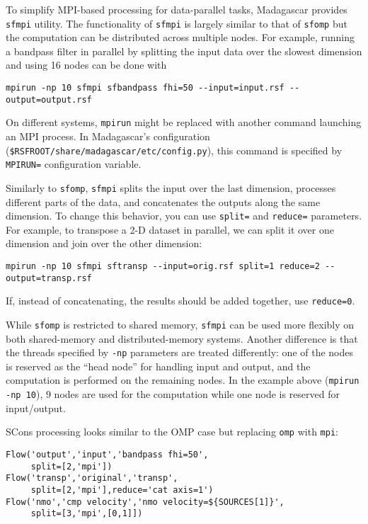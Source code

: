 To simplify MPI-based processing for data-parallel tasks, Madagascar
provides \texttt{sfmpi} utility. The functionality of \texttt{sfmpi}
is largely similar to that of \texttt{sfomp} but the computation can
be distributed across multiple nodes. For example, running a bandpass
filter in parallel by splitting the input data over the slowest
dimension and using 16 nodes can be done with
\begin{verbatim}
mpirun -np 10 sfmpi sfbandpass fhi=50 --input=input.rsf --output=output.rsf
\end{verbatim}
On different systems, \texttt{mpirun} might be replaced with another
command launching an MPI process. In Madagascar's configuration
(\texttt{\$RSFROOT/share/madagascar/etc/config.py}), this command is
specified by \texttt{MPIRUN=} configuration variable.

Similarly to \texttt{sfomp}, \texttt{sfmpi} splits the input over the last dimension,
processes different parts of the data, and concatenates the outputs
along the same dimension. To change this behavior, you can use
\texttt{split=} and \texttt{reduce=} parameters. For example, to
transpose a 2-D dataset in parallel, we can split it over one
dimension and join over the other dimension:
\begin{verbatim}
mpirun -np 10 sfmpi sftransp --input=orig.rsf split=1 reduce=2 --output=transp.rsf
\end{verbatim}
If, instead of concatenating, the results should be added together, use \texttt{reduce=0}.

While \texttt{sfomp} is restricted to shared memory, \texttt{sfmpi}
can be used more flexibly on both shared-memory and distributed-memory
systems. Another difference is that the threads specified by
\texttt{-np} parameters are treated differently: one of the nodes is
reserved as the ``head node'' for handling input and output, and the
computation is performed on the remaining nodes. In the example above
(\texttt{mpirun -np 10}), 9 nodes are used for the computation while
one node is reserved for input/output.

SCons processing looks similar to the OMP case but replacing \texttt{omp} with \texttt{mpi}:
\lstset{language=python,showstringspaces=false,frame=single}
\begin{lstlisting}
Flow('output','input','bandpass fhi=50',
     split=[2,'mpi'])
Flow('transp','original','transp',
     split=[2,'mpi'],reduce='cat axis=1')
Flow('nmo','cmp velocity','nmo velocity=${SOURCES[1]}',
     split=[3,'mpi',[0,1]])
\end{lstlisting}

